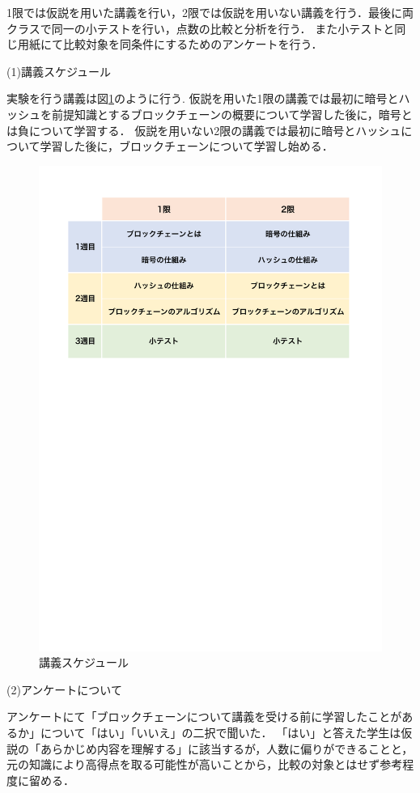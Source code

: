 \documentclass[a4j,12pt]{jsarticle}
\begin{document}
1限では仮説を用いた講義を行い，2限では仮説を用いない講義を行う．最後に両クラスで同一の小テストを行い，点数の比較と分析を行う．
また小テストと同じ用紙にて比較対象を同条件にするためのアンケートを行う．

(1)講義スケジュール

実験を行う講義は図\ref{fig:timeline}のように行う.
仮説を用いた1限の講義では最初に暗号とハッシュを前提知識とするブロックチェーンの概要について学習した後に，暗号とは負について学習する．
仮説を用いない2限の講義では最初に暗号とハッシュについて学習した後に，ブロックチェーンについて学習し始める．
\begin{figure}[H]
\centering
\includegraphics[mediaboxonly=/CropBox,width=12cm]{timeline.pdf}
\caption{講義スケジュール}
\label{fig:timeline}
\end{figure} 

(2)アンケートについて

アンケートにて「ブロックチェーンについて講義を受ける前に学習したことがあるか」について「はい」「いいえ」の二択で聞いた．
「はい」と答えた学生は仮説の「あらかじめ内容を理解する」に該当するが，人数に偏りができることと，元の知識により高得点を取る可能性が高いことから，比較の対象とはせず参考程度に留める．
\end{document}
